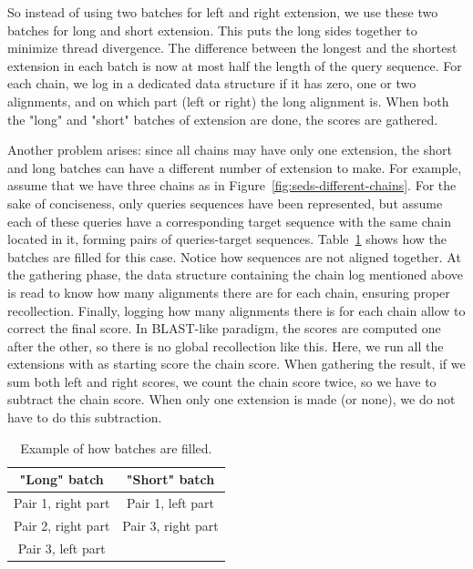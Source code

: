 So instead of using two batches for left and right extension, we use these two batches for long and short extension. This puts the long sides together to minimize thread divergence. The difference between the longest and the shortest extension in each batch is now at most half the length of the query sequence. For each chain, we log in a dedicated data structure if it has zero, one or two alignments, and on which part (left or right) the long alignment is. When both the "long" and "short" batches of extension are done, the scores are gathered.

Another problem arises: since all chains may have only one extension, the short and long batches can have a different number of extension to make. For example, assume that we have three chains as in Figure~\ref{fig:seds-different-chains}. For the sake of conciseness, only queries sequences have been represented, but assume each of these queries have a corresponding target sequence with the same chain located in it, forming pairs of queries-target sequences. Table~\ref{tbl:batches} shows how the batches are filled for this case. Notice how sequences are not aligned together. At the gathering phase, the data structure containing the chain log mentioned above is read to know how many alignments there are for each chain, ensuring proper recollection. Finally, logging how many alignments there is for each chain allow to correct the final score. In BLAST-like paradigm, the scores are computed one after the other, so there is no global recollection like this. Here, we run all the extensions with as starting score the chain score. When gathering the result, if we sum both left and right scores, we count the chain score twice, so we have to subtract the chain score. When only one extension is made (or none), we do not have to do this subtraction.

\begin{table}
	\centering
	\begin{tabular}{|c|c|}
		\hline 
		\textbf{"Long" batch} & \textbf{"Short" batch} \\ 
		\hline 
		Pair 1, right part & Pair 1, left part \\ 
		\hline 
		Pair 2, right part & Pair 3, right part \\ 
		\hline 
		Pair 3, left part &  \\ 
		\hline 
	\end{tabular} 
	\caption{Example of how batches are filled.}
	\label{tbl:batches}
\end{table}

